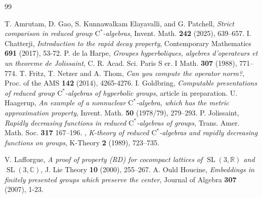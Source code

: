 \documentclass{amsart}
\newcommand{\cstar}{$\mathrm{C}^*$}
\theoremstyle{plain}
\theoremstyle{definition}
\numberwithin{equation}{section}
\begin{document}
\begin{thebibliography}{99}

 T. Amrutam, D. Gao, S. Kunnawalkam Elayavalli, and G. Patchell, \emph{Strict comparison in reduced group \cstar-algebras}, Invent. Math. \textbf{242} (2025), 639–657.
 I. Chatterji, \emph{Introduction to the rapid decay property}, Contemporary Mathematics \textbf{691} (2017), 53-72.
 P. de la Harpe, \emph{Groupes hyperboliques, algebres d’operateurs et un theoreme de Jolissaint}, C. R. Acad. Sci. Paris S er. I Math. \textbf{307} (1988), 771–774.
  T. Fritz, T. Netzer and A. Thom,  \emph{Can you compute the operator norm?}, Proc. of the AMS \textbf{142} (2014), 4265-4276.
  I. Goldbring, \emph{Computable presentations of reduced group \cstar-algebras of hyperbolic groups}, article in preparation.
  U. Haagerup, \emph{An example of a nonnuclear \cstar-algebra, which has the metric approximation property}, Invent. Math. \textbf{50} (1978/79), 279–293.
  P. Jolissaint, \emph{Rapidly decreasing functions in reduced \cstar-algebras of groups}, Trans. Amer. Math. Soc. \textbf{317} 167–196.
 \bysame, \emph{K-theory of reduced \cstar-algebras and rapidly decreasing functions on groups}, K-Theory \textbf{2} (1989), 723–735.

 V. Lafforgue, \emph{A proof of property (RD) for cocompact lattices of $\operatorname{SL}(3, \mathbb{R})$ and $\operatorname{SL}(3, \mathbb{C})$}, J. Lie Theory \textbf{10} (2000), 255–267.
 A. Ould Houcine, \emph{Embeddings in finitely presented groups which preserve the center}, Journal of Algebra \textbf{307} (2007), 1-23.
\end{thebibliography}
\end{document}
